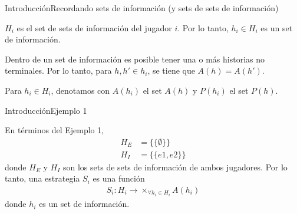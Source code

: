 \documentclass[notes, 11pt]{beamer} %
\newenvironment{wideitemize}{\itemize\addtolength{\itemsep}{10pt}}{\enditemize}
\begin{document}

\begin{frame}{Introducci\'on}{Recordando sets de informaci\'on (y sets de sets de informaci\'on)}
	\begin{wideitemize}
		\item<1-> $H_{i}$ es el set de sets de informaci\'on del jugador $i$. Por lo tanto, $h_{i} \in H_{i}$ es un set de informaci\'on.
		\item<2-> Dentro de un set de informaci\'on es posible tener una o m\'as historias no terminales. Por lo tanto, para $h,h' \in h_{i}$, se tiene que $A(h)=A(h')$. 
		\item<3-> Para $h_{i} \in H_{i}$, denotamos con $A(h_{i})$ el set $A(h)$ y $P(h_{i})$ el set $P(h)$. 
	\end{wideitemize}
\end{frame}

\begin{frame}{Introducci\'on}{Ejemplo 1}
	\begin{wideitemize}
		\item<1-> En t\'erminos del Ejemplo 1,
		\begin{align*}
			H_{E} &= \{ \{\emptyset\} \} \\
			H_{I} &= \{ \{ e1, e2 \} \}
		\end{align*} donde $H_{E}$ y $H_{I}$ son los sets de sets de informaci\'on de ambos jugadores. Por lo tanto, una estrategia $S_{i}$ es una funci\'on 
		\begin{align*}
		S_{i}: H_{i} \rightarrow \times_{\forall h_{i}\in H_{i}} A(h_{i})
		\end{align*} donde $h_{i}$ es un set de informaci\'on.
	\end{wideitemize}
\end{frame}
\end{document}
